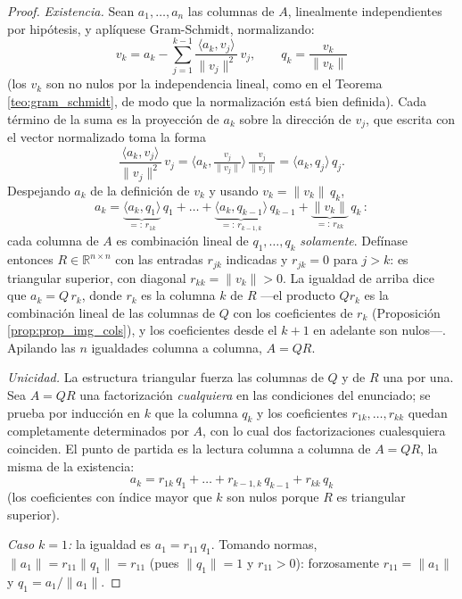 \documentclass[11pt, a4paper]{article}
\begin{document}
\begin{proof}
\textit{Existencia.} Sean $a_1, \dots, a_n$ las columnas de $A$, linealmente independientes por hipótesis, y aplíquese Gram-Schmidt, normalizando:
\[
v_k = a_k - \sum_{j=1}^{k-1} \frac{\langle a_k, v_j \rangle}{\|v_j\|^2} \, v_j, \qquad q_k = \frac{v_k}{\|v_k\|}
\]
(los $v_k$ son no nulos por la independencia lineal, como en el Teorema \ref{teo:gram_schmidt}, de modo que la normalización está bien definida). Cada término de la suma es la proyección de $a_k$ sobre la dirección de $v_j$, que escrita con el vector normalizado toma la forma
\[
\frac{\langle a_k, v_j \rangle}{\|v_j\|^2} \, v_j
= \Big\langle a_k, \tfrac{v_j}{\|v_j\|} \Big\rangle \, \tfrac{v_j}{\|v_j\|}
= \langle a_k, q_j \rangle \, q_j.
\]
Despejando $a_k$ de la definición de $v_k$ y usando $v_k = \|v_k\| \, q_k$,
\[
a_k = \underbrace{\langle a_k, q_1 \rangle}_{=: \, r_{1k}} \, q_1 + \dots + \underbrace{\langle a_k, q_{k-1} \rangle}_{=: \, r_{k-1,k}} \, q_{k-1} + \underbrace{\|v_k\|}_{=: \, r_{kk}} \, q_k \, :
\]
cada columna de $A$ es combinación lineal de $q_1, \dots, q_k$ \emph{solamente}. Defínase entonces $R \in \mathbb{R}^{n \times n}$ con las entradas $r_{jk}$ indicadas y $r_{jk} = 0$ para $j > k$: es triangular superior, con diagonal $r_{kk} = \|v_k\| > 0$. La igualdad de arriba dice que $a_k = Q \, r_k$, donde $r_k$ es la columna $k$ de $R$ —el producto $Q r_k$ es la combinación lineal de las columnas de $Q$ con los coeficientes de $r_k$ (Proposición \ref{prop:prop_img_cols}), y los coeficientes desde el $k+1$ en adelante son nulos—. Apilando las $n$ igualdades columna a columna, $A = QR$.

\textit{Unicidad.} La estructura triangular fuerza las columnas de $Q$ y de $R$ una por una. Sea $A = QR$ una factorización \emph{cualquiera} en las condiciones del enunciado; se prueba por inducción en $k$ que la columna $q_k$ y los coeficientes $r_{1k}, \dots, r_{kk}$ quedan completamente determinados por $A$, con lo cual dos factorizaciones cualesquiera coinciden. El punto de partida es la lectura columna a columna de $A = QR$, la misma de la existencia:
\[
a_k = r_{1k} \, q_1 + \dots + r_{k-1,k} \, q_{k-1} + r_{kk} \, q_k
\]
(los coeficientes con índice mayor que $k$ son nulos porque $R$ es triangular superior).

\textit{Caso $k = 1$:} la igualdad es $a_1 = r_{11} \, q_1$. Tomando normas, $\|a_1\| = r_{11} \|q_1\| = r_{11}$ (pues $\|q_1\| = 1$ y $r_{11} > 0$): forzosamente $r_{11} = \|a_1\|$ y $q_1 = a_1 / \|a_1\|$.


\end{proof}
\end{document}
